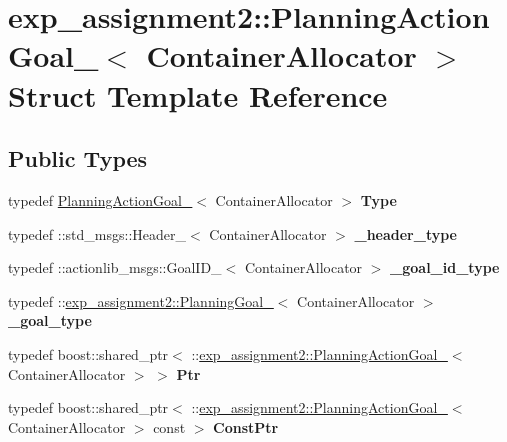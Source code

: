 \hypertarget{structexp__assignment2_1_1PlanningActionGoal__}{}\section{exp\+\_\+assignment2\+:\+:Planning\+Action\+Goal\+\_\+$<$ Container\+Allocator $>$ Struct Template Reference}
\label{structexp__assignment2_1_1PlanningActionGoal__}
\subsection*{Public Types}
\begin{DoxyCompactItemize}
\item 
\mbox{\label{structexp__assignment2_1_1PlanningActionGoal___a99effa9b6678ccda27ec469d7a4ba8d7}} 
typedef \hyperlink{structexp__assignment2_1_1PlanningActionGoal__}{Planning\+Action\+Goal\+\_\+}$<$ Container\+Allocator $>$ {\bfseries Type}
\item 
\mbox{\label{structexp__assignment2_1_1PlanningActionGoal___acfcb1c6797e70b72ac139e693c86ecd8}} 
typedef \+::std\+\_\+msgs\+::\+Header\+\_\+$<$ Container\+Allocator $>$ {\bfseries \+\_\+header\+\_\+type}
\item 
\mbox{\label{structexp__assignment2_1_1PlanningActionGoal___abacff5618af6f6bd8630d81d3b635a21}} 
typedef \+::actionlib\+\_\+msgs\+::\+Goal\+I\+D\+\_\+$<$ Container\+Allocator $>$ {\bfseries \+\_\+goal\+\_\+id\+\_\+type}
\item 
\mbox{\label{structexp__assignment2_1_1PlanningActionGoal___abc407654551c7e6dfa27059549747760}} 
typedef \+::\hyperlink{structexp__assignment2_1_1PlanningGoal__}{exp\+\_\+assignment2\+::\+Planning\+Goal\+\_\+}$<$ Container\+Allocator $>$ {\bfseries \+\_\+goal\+\_\+type}
\item 
\mbox{\label{structexp__assignment2_1_1PlanningActionGoal___afb5cc1fb4d3658528d8074cf2e05f527}} 
typedef boost\+::shared\+\_\+ptr$<$ \+::\hyperlink{structexp__assignment2_1_1PlanningActionGoal__}{exp\+\_\+assignment2\+::\+Planning\+Action\+Goal\+\_\+}$<$ Container\+Allocator $>$ $>$ {\bfseries Ptr}
\item 
\mbox{\label{structexp__assignment2_1_1PlanningActionGoal___a4412d5cdd12ff2afcf6db02180086e83}} 
typedef boost\+::shared\+\_\+ptr$<$ \+::\hyperlink{structexp__assignment2_1_1PlanningActionGoal__}{exp\+\_\+assignment2\+::\+Planning\+Action\+Goal\+\_\+}$<$ Container\+Allocator $>$ const  $>$ {\bfseries Const\+Ptr}
\end{DoxyCompactItemize}
